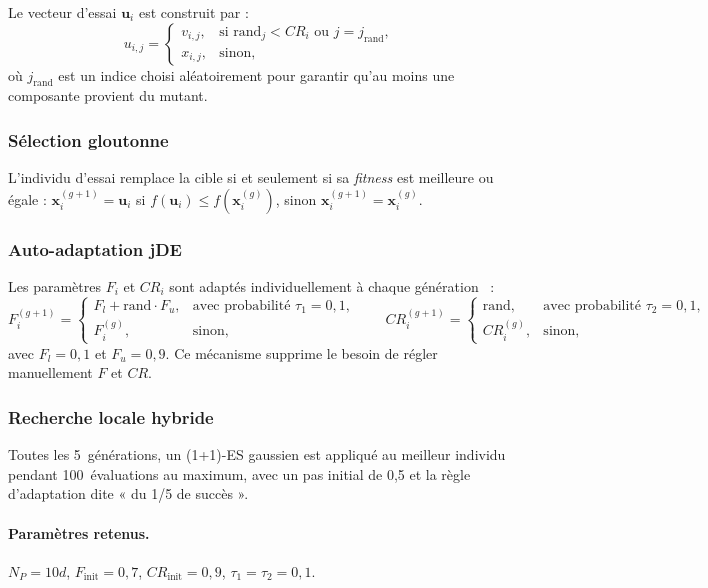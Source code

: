 Le vecteur d'essai $\mathbf{u}_i$ est construit par :
\[
  u_{i,j} =
  \begin{cases}
    v_{i,j}, & \text{si } \text{rand}_j < CR_i \text{ ou } j = j_{\text{rand}}, \\
    x_{i,j}, & \text{sinon},
  \end{cases}
\]
où $j_{\text{rand}}$ est un indice choisi aléatoirement pour garantir qu'au
moins une composante provient du mutant.

\subsubsection{Sélection gloutonne}

L'individu d'essai remplace la cible si et seulement si sa \textit{fitness} est
meilleure ou égale :
$\mathbf{x}_i^{(g+1)} = \mathbf{u}_i$ si $f(\mathbf{u}_i) \leq
f(\mathbf{x}_i^{(g)})$, sinon $\mathbf{x}_i^{(g+1)} = \mathbf{x}_i^{(g)}$.

\subsubsection{Auto-adaptation jDE}

Les paramètres $F_i$ et $CR_i$ sont adaptés individuellement à chaque
génération~\cite{brest2006} :
\[
  F_i^{(g+1)} =
  \begin{cases}
    F_l + \text{rand} \cdot F_u, & \text{avec probabilité } \tau_1 = 0{,}1, \\
    F_i^{(g)}, & \text{sinon},
  \end{cases}
  \qquad
  CR_i^{(g+1)} =
  \begin{cases}
    \text{rand}, & \text{avec probabilité } \tau_2 = 0{,}1, \\
    CR_i^{(g)}, & \text{sinon},
  \end{cases}
\]
avec $F_l = 0{,}1$ et $F_u = 0{,}9$.  Ce mécanisme supprime le besoin de
régler manuellement $F$ et $CR$.

\subsubsection{Recherche locale hybride}

Toutes les 5~générations, un (1+1)-ES gaussien est appliqué au meilleur
individu pendant 100~évaluations au maximum, avec un pas initial de 0,5 et
la règle d'adaptation dite « du 1/5 de succès ».

\paragraph{Paramètres retenus.}
$N_P = 10d$, $F_{\text{init}} = 0{,}7$, $CR_{\text{init}} = 0{,}9$,
$\tau_1 = \tau_2 = 0{,}1$.

